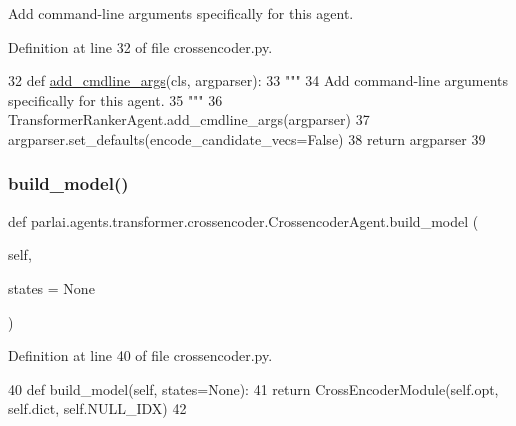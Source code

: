 \begin{DoxyVerb}Add command-line arguments specifically for this agent.
\end{DoxyVerb}
 

Definition at line 32 of file crossencoder.\+py.


\begin{DoxyCode}
32     \textcolor{keyword}{def }\hyperlink{namespaceparlai_1_1agents_1_1drqa_1_1config_a62fdd5554f1da6be0cba185271058320}{add\_cmdline\_args}(cls, argparser):
33         \textcolor{stringliteral}{"""}
34 \textcolor{stringliteral}{        Add command-line arguments specifically for this agent.}
35 \textcolor{stringliteral}{        """}
36         TransformerRankerAgent.add\_cmdline\_args(argparser)
37         argparser.set\_defaults(encode\_candidate\_vecs=\textcolor{keyword}{False})
38         \textcolor{keywordflow}{return} argparser
39 
\end{DoxyCode}
\mbox{\label{classparlai_1_1agents_1_1transformer_1_1crossencoder_1_1CrossencoderAgent_af63326f1f4d295e7a1a7fad4b07e077d}} 
\subsubsection{\texorpdfstring{build\+\_\+model()}{build\_model()}}
{\footnotesize\ttfamily def parlai.\+agents.\+transformer.\+crossencoder.\+Crossencoder\+Agent.\+build\+\_\+model (\begin{DoxyParamCaption}\item[{}]{self,  }\item[{}]{states = {\ttfamily None} }\end{DoxyParamCaption})}



Definition at line 40 of file crossencoder.\+py.


\begin{DoxyCode}
40     \textcolor{keyword}{def }build\_model(self, states=None):
41         \textcolor{keywordflow}{return} CrossEncoderModule(self.opt, self.dict, self.NULL\_IDX)
42 
\end{DoxyCode}
\mbox{\label{classparlai_1_1agents_1_1transformer_1_1crossencoder_1_1CrossencoderAgent_a5c286ce0bc163e443e73182f95d6e0c6}} 
